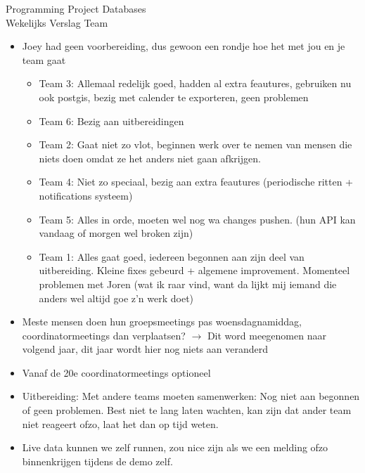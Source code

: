 \documentclass{article}
\newcounter{team}
\begin{document}

	\begin{Minutes}{Programming Project Databases \\ Wekelijks Verslag Team }
		\missingNoExcuse{/}

		\maketitle

            \begin{itemize}
                \item Joey had geen voorbereiding, dus gewoon een rondje hoe het met jou en je team gaat
                \begin{itemize}
                    \item Team 3: Allemaal redelijk goed, hadden al extra feautures, gebruiken nu ook postgis, bezig met calender te exporteren, geen problemen
                    \item Team 6: Bezig aan uitbereidingen
                    \item Team 2: Gaat niet zo vlot, beginnen werk over te nemen van mensen die niets doen omdat ze het anders niet gaan afkrijgen.
                    \item Team 4: Niet zo speciaal, bezig aan extra feautures (periodische ritten + notifications systeem)
                    \item Team 5: Alles in orde, moeten wel nog wa changes pushen. (hun API kan vandaag of morgen wel broken zijn)
                    \item Team 1: Alles gaat goed, iedereen begonnen aan zijn deel van uitbereiding. Kleine fixes gebeurd + algemene improvement. Momenteel problemen met Joren (wat ik raar vind, want da lijkt mij iemand die anders wel altijd goe z'n werk doet)
                \end{itemize}
                \item Meste mensen doen hun groepsmeetings pas woensdagnamiddag, coordinatormeetings dan verplaatsen? $\rightarrow$ Dit word meegenomen naar volgend jaar, dit jaar wordt hier nog niets aan veranderd
                \item Vanaf de 20e coordinatormeetings optioneel
                \item Uitbereiding: Met andere teams moeten samenwerken: Nog niet aan begonnen of geen problemen. Best niet te lang laten wachten, kan zijn dat ander team niet reageert ofzo, laat het dan op tijd weten.
                \item Live data kunnen we zelf runnen, zou nice zijn als we een melding ofzo binnenkrijgen tijdens de demo zelf.
            \end{itemize}


\end{Minutes}
\end{document}
